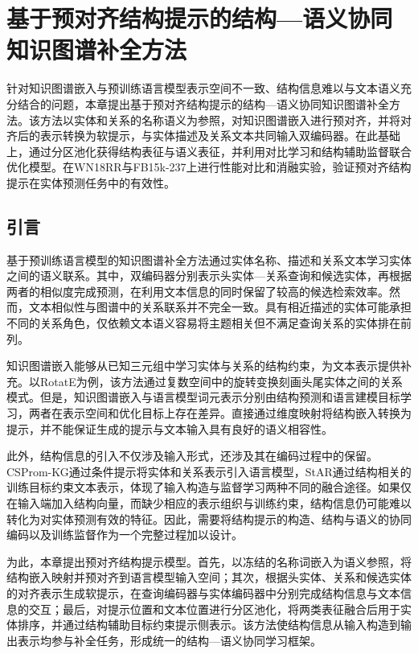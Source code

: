 \chapter{基于预对齐结构提示的结构—语义协同知识图谱补全方法}
\label{chap:prealign}

针对知识图谱嵌入与预训练语言模型表示空间不一致、结构信息难以与文本语义充分结合的问题，本章提出基于预对齐结构提示的结构—语义协同知识图谱补全方法。该方法以实体和关系的名称语义为参照，对知识图谱嵌入进行预对齐，并将对齐后的表示转换为软提示，与实体描述及关系文本共同输入双编码器。在此基础上，通过分区池化获得结构表征与语义表征，并利用对比学习和结构辅助监督联合优化模型。在WN18RR与FB15k-237上进行性能对比和消融实验，验证预对齐结构提示在实体预测任务中的有效性。

\section{引言}

基于预训练语言模型的知识图谱补全方法通过实体名称、描述和关系文本学习实体之间的语义联系。其中，双编码器分别表示头实体—关系查询和候选实体，再根据两者的相似度完成预测，在利用文本信息的同时保留了较高的候选检索效率\cite{wang2022simkgc}。然而，文本相似性与图谱中的关系联系并不完全一致。具有相近描述的实体可能承担不同的关系角色，仅依赖文本语义容易将主题相关但不满足查询关系的实体排在前列。

知识图谱嵌入能够从已知三元组中学习实体与关系的结构约束，为文本表示提供补充。以RotatE为例，该方法通过复数空间中的旋转变换刻画头尾实体之间的关系模式\cite{sun2019rotate}。但是，知识图谱嵌入与语言模型词元表示分别由结构预测和语言建模目标学习，两者在表示空间和优化目标上存在差异。直接通过维度映射将结构嵌入转换为提示，并不能保证生成的提示与文本输入具有良好的语义相容性。

此外，结构信息的引入不仅涉及输入形式，还涉及其在编码过程中的保留。CSProm-KG通过条件提示将实体和关系表示引入语言模型\cite{chen2023cspromkg}，StAR通过结构相关的训练目标约束文本表示\cite{wang2021structure}，体现了输入构造与监督学习两种不同的融合途径。如果仅在输入端加入结构向量，而缺少相应的表示组织与训练约束，结构信息仍可能难以转化为对实体预测有效的特征。因此，需要将结构提示的构造、结构与语义的协同编码以及训练监督作为一个完整过程加以设计。

为此，本章提出预对齐结构提示模型。首先，以冻结的名称词嵌入为语义参照，将结构嵌入映射并预对齐到语言模型输入空间；其次，根据头实体、关系和候选实体的对齐表示生成软提示，在查询编码器与实体编码器中分别完成结构信息与文本信息的交互；最后，对提示位置和文本位置进行分区池化，将两类表征融合后用于实体排序，并通过结构辅助目标约束提示侧表示。该方法使结构信息从输入构造到输出表示均参与补全任务，形成统一的结构—语义协同学习框架。

